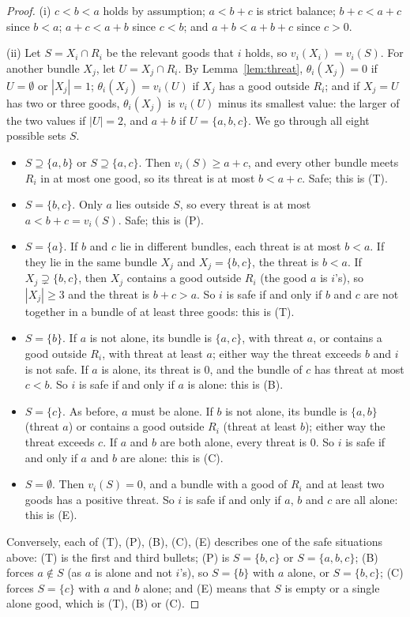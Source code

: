 \documentclass[runningheads,11pt]{llncs}
\begin{document}
\begin{proof}
(i) $c<b<a$ holds by assumption; $a<b+c$ is strict balance; $b+c<a+c$ since $b<a$; $a+c<a+b$ since $c<b$; and $a+b<a+b+c$ since $c>0$.

(ii) Let $S=X_i\cap R_i$ be the relevant goods that $i$ holds, so $v_i(X_i)=v_i(S)$. For another bundle $X_j$, let $U=X_j\cap R_i$. By Lemma~\ref{lem:threat}, $\theta_i(X_j)=0$ if $U=\emptyset$ or $|X_j|=1$; $\theta_i(X_j)=v_i(U)$ if $X_j$ has a good outside $R_i$; and if $X_j=U$ has two or three goods, $\theta_i(X_j)$ is $v_i(U)$ minus its smallest value: the larger of the two values if $|U|=2$, and $a+b$ if $U=\{a,b,c\}$. We go through all eight possible sets $S$.
\begin{itemize}
\item $S\supseteq\{a,b\}$ or $S\supseteq\{a,c\}$. Then $v_i(S)\ge a+c$, and every other bundle meets $R_i$ in at most one good, so its threat is at most $b<a+c$. Safe; this is (T).
\item $S=\{b,c\}$. Only $a$ lies outside $S$, so every threat is at most $a<b+c=v_i(S)$. Safe; this is (P).
\item $S=\{a\}$. If $b$ and $c$ lie in different bundles, each threat is at most $b<a$. If they lie in the same bundle $X_j$ and $X_j=\{b,c\}$, the threat is $b<a$. If $X_j\supsetneq\{b,c\}$, then $X_j$ contains a good outside $R_i$ (the good $a$ is $i$'s), so $|X_j|\ge3$ and the threat is $b+c>a$. So $i$ is safe if and only if $b$ and $c$ are not together in a bundle of at least three goods: this is (T).
\item $S=\{b\}$. If $a$ is not alone, its bundle is $\{a,c\}$, with threat $a$, or contains a good outside $R_i$, with threat at least $a$; either way the threat exceeds $b$ and $i$ is not safe. If $a$ is alone, its threat is $0$, and the bundle of $c$ has threat at most $c<b$. So $i$ is safe if and only if $a$ is alone: this is (B).
\item $S=\{c\}$. As before, $a$ must be alone. If $b$ is not alone, its bundle is $\{a,b\}$ (threat $a$) or contains a good outside $R_i$ (threat at least $b$); either way the threat exceeds $c$. If $a$ and $b$ are both alone, every threat is $0$. So $i$ is safe if and only if $a$ and $b$ are alone: this is (C).
\item $S=\emptyset$. Then $v_i(S)=0$, and a bundle with a good of $R_i$ and at least two goods has a positive threat. So $i$ is safe if and only if $a$, $b$ and $c$ are all alone: this is (E).
\end{itemize}
Conversely, each of (T), (P), (B), (C), (E) describes one of the safe situations above: (T) is the first and third bullets; (P) is $S=\{b,c\}$ or $S=\{a,b,c\}$; (B) forces $a\notin S$ (as $a$ is alone and not $i$'s), so $S=\{b\}$ with $a$ alone, or $S=\{b,c\}$; (C) forces $S=\{c\}$ with $a$ and $b$ alone; and (E) means that $S$ is empty or a single alone good, which is (T), (B) or (C).


\end{proof}
\end{document}
